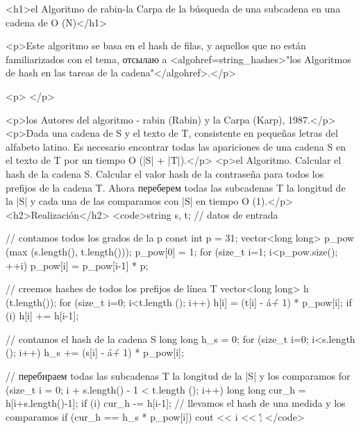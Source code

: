 <h1>el Algoritmo de rabin-la Carpa de la búsqueda de una subcadena en una cadena de O (N)</h1>

<p>Este algoritmo se basa en el hash de filas, y aquellos que no están familiarizados con el tema, отсылаю a <algohref=string_hashes>"los Algoritmos de hash en las tareas de la cadena"</algohref>.</p>

<p> </p>

<p>los Autores del algoritmo - rabin (Rabin) y la Carpa (Karp), 1987.</p>
<p>Dada una cadena de S y el texto de T, consistente en pequeñas letras del alfabeto latino. Es necesario encontrar todas las apariciones de una cadena S en el texto de T por un tiempo O (|S| + |T|).</p>
<p>el Algoritmo. Calcular el hash de la cadena S. Calcular el valor hash de la contraseña para todos los prefijos de la cadena T. Ahora переберем todas las subcadenas T la longitud de la |S| y cada una de las comparamos con |S| en tiempo O (1).</p>
<h2>Realización</h2>
<code>string s, t; // datos de entrada

// contamos todos los grados de la p
const int p = 31;
vector<long long> p_pow (max (s.length(), t.length()));
p_pow[0] = 1;
for (size_t i=1; i<p_pow.size(); ++i)
p_pow[i] = p_pow[i-1] * p;

// creemos hashes de todos los prefijos de línea T
vector<long long> h (t.length());
for (size_t i=0; i<t.length (); i++)
{
h[i] = (t[i] - \'a\' + 1) * p_pow[i];
if (i) h[i] += h[i-1];
}

// contamos el hash de la cadena S
long long h_s = 0;
for (size_t i=0; i<s.length (); i++)
h_s += (s[i] - \'a\' + 1) * p_pow[i];

// перебираем todas las subcadenas T la longitud de la |S| y los comparamos
for (size_t i = 0; i + s.length() - 1 < t.length (); i++)
{
long long cur_h = h[i+s.length()-1];
if (i) cur_h -= h[i-1];
// llevamos el hash de una medida y los comparamos
if (cur_h == h_s * p_pow[i])
cout << i << \' \';
}</code>